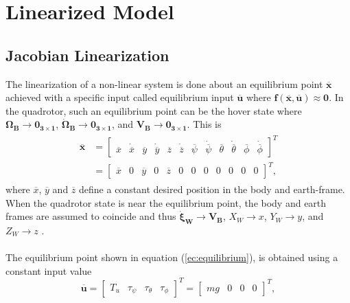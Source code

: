 \section{Linearized Model}
\label{sec:linearized}
\setcounter{MaxMatrixCols}{20}
\subsection{Jacobian Linearization}
The linearization of a non-linear system is done about an equilibrium point $\overline{\mathbf{x}}$ achieved with a specific input called equilibrium input $\overline{\mathbf{u}}$  where $\mathbf{f(\overline{x},\overline{u})} \approx \mathbf{0}$. In the quadrotor, such an equilibrium point can be the hover state where $\mathbf{\Omega_B} \to \mathbf{0_{3\times 1}}$, $\mathbf{\dot{\Omega}_B} \to \mathbf{0_{3\times 1}}$, and $\mathbf{V_{B}} \to \mathbf{0_{3\times 1}}$. This is
\begin{align}
\label{ec:equilibrium}
\begin{split}
\overline{\mathbf{x}} & = \begin{bmatrix}
\overline{x} & \dot{\overline{x}} & \overline{y} & \dot{\overline{y}} & \overline{z} & \dot{\overline{z}} & \overline{\psi} & \dot{\overline{\psi}} & \overline{\theta} & \dot{\overline{\theta}} & \overline{\phi} & \dot{\overline{\phi}}
\end{bmatrix}^{T}\\
 & = \begin{bmatrix}
\overline{x} & 0 & \overline{y} & 0 & \overline{z} & 0 & 0 & 0 & 0 & 0 & 0 & 0
\end{bmatrix}^{T},
\end{split}
\end{align}
where $\overline{x}$, $\overline{y}$ and $\overline{z}$ define a constant desired position in the body and earth-frame. When the quadrotor state is near the equilibrium point, the body and earth frames are assumed to coincide and thus $\mathbf{\dot{\xi}_W}\to \mathbf{V_{B}}$, $X_W \to x$, $Y_W \to y$, and $Z_W \to z$ \cite{Sabatino2015}.\\\\
The equilibrium point shown in equation (\ref{ec:equilibrium}), is obtained using a constant input value
\begin{equation}
\overline{\mathbf{u}} = \begin{bmatrix}
T_u & \tau_\psi & \tau_\theta & \tau_\phi
\end{bmatrix}^{T} = \begin{bmatrix}
mg & 0 & 0 & 0
\end{bmatrix}^{T},
\end{equation}
